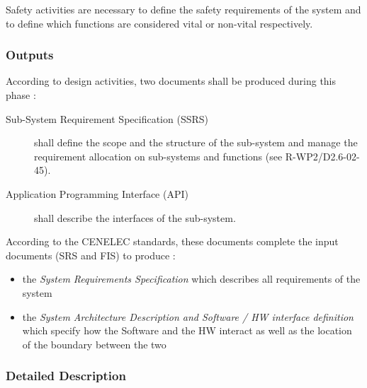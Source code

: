 Safety activities are necessary to define the safety requirements of the system and to define which functions are considered vital or non-vital respectively.

\subsubsection{Outputs}
\label{sec:sys-ana-outputs}

According to  design activities, two documents shall be produced during this phase :

\begin{description}
\item[Sub-System Requirement Specification (SSRS)] shall define the scope and the structure of the sub-system and  manage the requirement allocation on sub-systems and functions (see R-WP2/D2.6-02-45).
\item[Application Programming Interface (API)] shall describe the interfaces of the sub-system.
\end{description}


According to the CENELEC standards, these documents complete the input documents (SRS and FIS) to produce :
\begin{itemize}
\item the \emph{System  Requirements Specification} which describes all requirements of the system
\item the \emph{System Architecture Description
and Software / HW interface definition } which specify how the Software and the HW interact
as well as the location of the boundary between the two
\end{itemize}

\subsubsection{Detailed Description}
\label{sec:sys-ana-descr}

